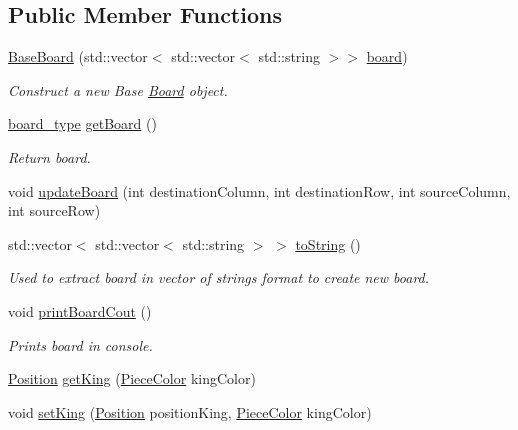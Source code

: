 \subsection*{Public Member Functions}
\begin{DoxyCompactItemize}
\item 
\hyperlink{class_base_board_a120d844f308b6ce12623d5a1ea59ccfb}{Base\+Board} (std\+::vector$<$ std\+::vector$<$ std\+::string $>$$>$ \hyperlink{class_base_board_ae52729f26a30d64d7d643187786e96c2}{board})
\begin{DoxyCompactList}\small\item\em Construct a new Base \hyperlink{class_board}{Board} object. \end{DoxyCompactList}\item 
\hyperlink{_a_i_class_8h_a6e73002e9c84a7986c39d7e80e83dc8d}{board\+\_\+type} \hyperlink{class_base_board_af8f8bdfb2aa7049b30efa40ea9acca20}{get\+Board} ()
\begin{DoxyCompactList}\small\item\em Return board. \end{DoxyCompactList}\item 
void \hyperlink{class_base_board_aeb96bf51fb9bb6fdc42a7abf87de6446}{update\+Board} (int destination\+Column, int destination\+Row, int source\+Column, int source\+Row)
\item 
std\+::vector$<$ std\+::vector$<$ std\+::string $>$ $>$ \hyperlink{class_base_board_ab3a49fb5a7284d66439b785e6add260f}{to\+String} ()
\begin{DoxyCompactList}\small\item\em Used to extract board in vector of strings format to create new board. \end{DoxyCompactList}\item 
void \hyperlink{class_base_board_a1c8fe600a3c0abea281b93cc8be71dd1}{print\+Board\+Cout} ()
\begin{DoxyCompactList}\small\item\em Prints board in console. \end{DoxyCompactList}\item 
\hyperlink{struct_position}{Position} \hyperlink{class_base_board_aebcd17c243c0748897b41fe683dd29f1}{get\+King} (\hyperlink{_piece_8h_ad7595c48bb74c0dd2a7648712a2d4985}{Piece\+Color} king\+Color)
\item 
void \hyperlink{class_base_board_a413af1d87b49a2ee4ce96cb0f165b01a}{set\+King} (\hyperlink{struct_position}{Position} position\+King, \hyperlink{_piece_8h_ad7595c48bb74c0dd2a7648712a2d4985}{Piece\+Color} king\+Color)
$$
\end{DoxyCompactItemize}
